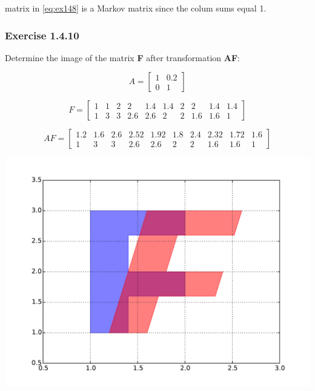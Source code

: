 matrix in \ref{eq:ex148} is a Markov matrix since the colum sums equal 1.

\subsubsection{Exercise 1.4.10}

Determine the image of the matrix \textbf{F} after transformation \textbf{AF}:

\begin{equation}
A = \left[\begin{matrix}1 & 0.2\\0 & 1\end{matrix}\right]
\end{equation}

\begin{equation}
F = \left[\begin{matrix}1 & 1 & 2 & 2 & 1.4 & 1.4 & 2 & 2 & 1.4 & 1.4\\1 & 3 & 3 & 2.6 & 2.6 & 2 & 2 & 1.6 & 1.6 & 1\end{matrix}\right]
\end{equation}

\begin{equation}
AF = \left[\begin{matrix}1.2 & 1.6 & 2.6 & 2.52 & 1.92 & 1.8 & 2.4 & 2.32 & 1.72 & 1.6\\1 & 3 & 3 & 2.6 & 2.6 & 2 & 2 & 1.6 & 1.6 & 1\end{matrix}\right]
\end{equation}

\includegraphics[width=\linewidth]{figs/1_4_10.pdf}

